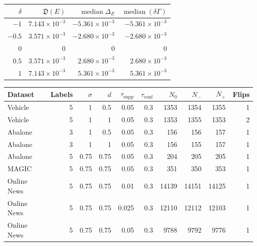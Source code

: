 \begin{table}
\label{tab:parameter}
\begin{tabular}{rrrr}
\toprule
$\delta$ & $\mathfrak{D}(E)$ & $\operatorname{median}\Delta_E$ & $\operatorname{median}(\delta\Gamma)$ \\
\midrule
$-1$ & $7.143\times10^{-3}$ & $-5.361\times10^{-3}$ & $-5.361\times10^{-3}$ \\
$-0.5$ & $3.571\times10^{-3}$ & $-2.680\times10^{-3}$ & $-2.680\times10^{-3}$ \\
$0$ & $0$ & $0$ & $0$ \\
$0.5$ & $3.571\times10^{-3}$ & $2.680\times10^{-3}$ & $2.680\times10^{-3}$ \\
$1$ & $7.143\times10^{-3}$ & $5.361\times10^{-3}$ & $5.361\times10^{-3}$ \\
\bottomrule
\end{tabular}
\end{table}

\begin{table}
\label{tab:matched-flips}
\begin{tabular}{lrrrrrrrrr}
\toprule
Dataset & Labels & $\sigma$ & $d$ & $\tau_{\mathrm{supp}}$ & $\tau_{\mathrm{conf}}$ & $N_0$ & $N_-$ & $N_+$ & Flips \\
\midrule
Vehicle & 5 & 1 & 0.5 & 0.05 & 0.3 & 1353 & 1354 & 1355 & 1 \\
Vehicle & 5 & 1 & 1 & 0.05 & 0.3 & 1353 & 1355 & 1353 & 2 \\
Abalone & 3 & 1 & 0.5 & 0.05 & 0.3 & 156 & 156 & 157 & 1 \\
Abalone & 3 & 1 & 1 & 0.05 & 0.3 & 156 & 155 & 157 & 1 \\
Abalone & 5 & 0.75 & 0.75 & 0.05 & 0.3 & 204 & 205 & 205 & 1 \\
MAGIC & 5 & 0.75 & 0.75 & 0.05 & 0.3 & 351 & 350 & 353 & 1 \\
Online News & 5 & 0.75 & 0.75 & 0.01 & 0.3 & 14139 & 14151 & 14125 & 1 \\
Online News & 5 & 0.75 & 0.75 & 0.025 & 0.3 & 12110 & 12112 & 12103 & 1 \\
Online News & 5 & 0.75 & 0.75 & 0.05 & 0.3 & 9788 & 9792 & 9776 & 1 \\
\bottomrule
\end{tabular}
\end{table}

